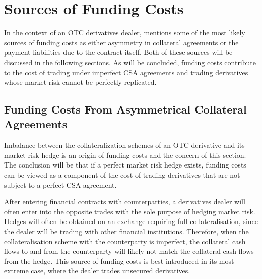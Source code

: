 \documentclass[main.tex]{subfiles}
\begin{document}
    \section{Sources of Funding Costs}
        In the context of an OTC derivatives dealer, 
        \textcite{Ruiz2013FVA} mentions some of the most likely sources of funding costs as
        either asymmetry in collateral agreements or the payment liabilities due to the contract itself.
        Both of these sources will be discussed in the following sections.
        As will be concluded, funding costs contribute to the cost of trading under imperfect CSA agreements 
        and trading derivatives whose market risk cannot be perfectly replicated.

    \subsection{Funding Costs From Asymmetrical Collateral Agreements}
    \label{sec:funding-asymmetric-collateral}
        Imbalance between the collateralization schemes of an OTC derivative and its market risk hedge
        is an origin of funding costs and the concern of this section.
        The conclusion will be that if a perfect market risk hedge exists, funding costs can be viewed 
        as a component of the cost of trading derivatives that are not subject to a perfect CSA agreement.

        After entering financial contracts with counterparties,
        a derivatives dealer will often enter into the opposite trades
        with the sole purpose of hedging market risk.
        Hedges will often be obtained on an exchange requiring full collateralisation,
        since the dealer will be trading with other financial institutions.
        Therefore, when the collateralisation scheme with the counterparty is imperfect, 
        the collateral cash flows to and from the counterparty will likely not match the collateral cash flows from the hedge.
        This source of funding costs is best introduced in its most extreme case, 
        where the dealer trades unsecured derivatives. 
\end{document}
